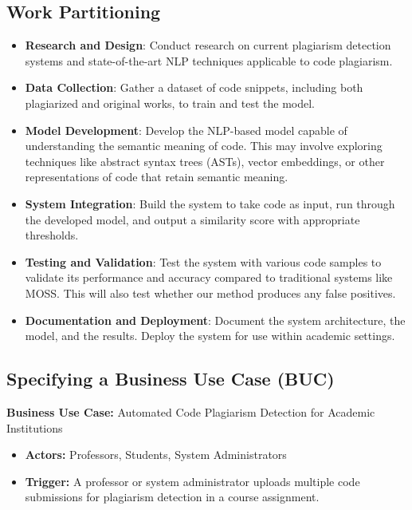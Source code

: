 \documentclass[12pt]{article}
\begin{document}
\subsection{Work Partitioning}
\begin{itemize}
  \item \textbf{Research and Design}: Conduct research on current plagiarism detection systems and state-of-the-art NLP techniques applicable to code plagiarism.
  
  \item \textbf{Data Collection}: Gather a dataset of code snippets, including both plagiarized and original works, to train and test the model.
  
  \item \textbf{Model Development}: Develop the NLP-based model capable of understanding the semantic meaning of code. This may involve exploring techniques like abstract syntax trees (ASTs), vector embeddings, or other representations of code that retain semantic meaning.
  
  \item \textbf{System Integration}: Build the system to take code as input, run through the developed model, and output a similarity score with appropriate thresholds.
  
  \item \textbf{Testing and Validation}: Test the system with various code samples to validate its performance and accuracy compared to traditional systems like MOSS. This will also test whether our method produces any false positives.
  
  \item \textbf{Documentation and Deployment}: Document the system architecture, the model, and the results. Deploy the system for use within academic settings.
\end{itemize}
\subsection{Specifying a Business Use Case (BUC)}

\textbf{Business Use Case:} Automated Code Plagiarism Detection for Academic Institutions

\begin{itemize}
    \item \textbf{Actors:} Professors, Students, System Administrators
    \item \textbf{Trigger:} A professor or system administrator uploads multiple code submissions for plagiarism detection in a course assignment.
\end{itemize}
\end{document}
